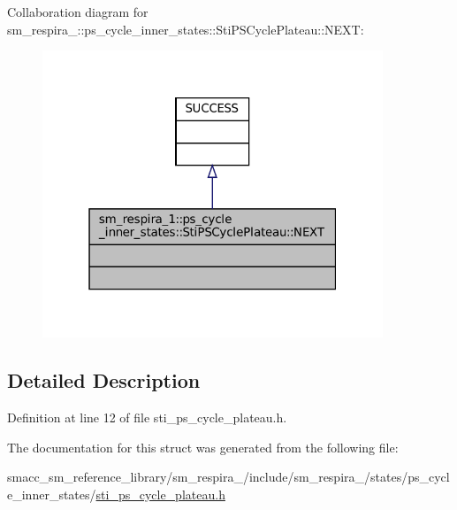 Collaboration diagram for sm\+\_\+respira\+\_\+:\+:ps\+\_\+cycle\+\_\+inner\+\_\+states\+:\+:Sti\+P\+S\+Cycle\+Plateau\+:\+:N\+E\+XT\+:
\nopagebreak
\begin{figure}[H]
\begin{center}
\leavevmode
\includegraphics[width=289pt]{structsm__respira__1_1_1ps__cycle__inner__states_1_1StiPSCyclePlateau_1_1NEXT__coll__graph}
\end{center}
\end{figure}


\subsection{Detailed Description}


Definition at line 12 of file sti\+\_\+ps\+\_\+cycle\+\_\+plateau.\+h.



The documentation for this struct was generated from the following file\+:\begin{DoxyCompactItemize}
\item 
smacc\+\_\+sm\+\_\+reference\+\_\+library/sm\+\_\+respira\+\_/include/sm\+\_\+respira\+\_/states/ps\+\_\+cycle\+\_\+inner\+\_\+states/\hyperlink{sti__ps__cycle__plateau_8h}{sti\+\_\+ps\+\_\+cycle\+\_\+plateau.\+h}\end{DoxyCompactItemize}

